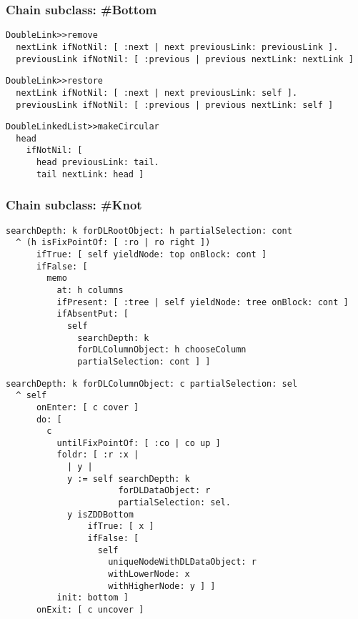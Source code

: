 \documentclass{beamer}
\begin{document}
\begin{frame}[fragile]
\frametitle{Chain subclass: \#Bottom}
\begin{verbatim}
DoubleLink>>remove
  nextLink ifNotNil: [ :next | next previousLink: previousLink ].
  previousLink ifNotNil: [ :previous | previous nextLink: nextLink ]
\end{verbatim}
\vfill
\begin{verbatim}
DoubleLink>>restore
  nextLink ifNotNil: [ :next | next previousLink: self ].
  previousLink ifNotNil: [ :previous | previous nextLink: self ]
\end{verbatim}
\vfill
\begin{verbatim}
DoubleLinkedList>>makeCircular
  head
    ifNotNil: [ 
      head previousLink: tail.
      tail nextLink: head ]
\end{verbatim}
\end{frame}

\begin{frame}[fragile]
\frametitle{Chain subclass: \#Knot}
\begin{verbatim}
searchDepth: k forDLRootObject: h partialSelection: cont
  ^ (h isFixPointOf: [ :ro | ro right ])
      ifTrue: [ self yieldNode: top onBlock: cont ]
      ifFalse: [ 
        memo
          at: h columns
          ifPresent: [ :tree | self yieldNode: tree onBlock: cont ]
          ifAbsentPut: [ 
            self
              searchDepth: k
              forDLColumnObject: h chooseColumn
              partialSelection: cont ] ]
\end{verbatim}
\end{frame}

\begin{frame}[fragile]
\begin{verbatim}
searchDepth: k forDLColumnObject: c partialSelection: sel
  ^ self
      onEnter: [ c cover ]
      do: [ 
        c
          untilFixPointOf: [ :co | co up ]
          foldr: [ :r :x | 
            | y |
            y := self searchDepth: k 
                      forDLDataObject: r 
                      partialSelection: sel.
            y isZDDBottom
                ifTrue: [ x ]
                ifFalse: [ 
                  self
                    uniqueNodeWithDLDataObject: r
                    withLowerNode: x
                    withHigherNode: y ] ]
          init: bottom ]
      onExit: [ c uncover ]
\end{verbatim}
\end{frame}
\end{document}

